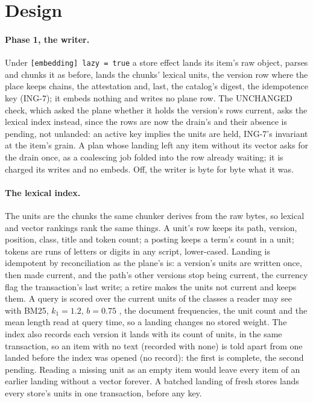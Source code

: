 \documentclass[11pt]{article}
\theoremstyle{plain}
\theoremstyle{definition}
\theoremstyle{remark}
\newcommand{\code}[1]{\texttt{#1}}
\newcommand{\ing}[1]{ING-#1}
\begin{document}
\section{Design}\label{sec:design}

\paragraph{Phase 1, the writer.} Under \code{[embedding] lazy = true} a store effect lands its
item's raw object, parses and chunks it as before, lands the chunks' lexical units, the version
row where the place keeps chains, the attestation and, last, the catalog's digest, the idempotence
key (\ing{7}); it embeds nothing and writes no plane row. The UNCHANGED check, which asked the
plane whether it holds the version's rows current, asks the lexical index instead, since the rows
are now the drain's and their absence is pending, not unlanded: an active key implies the units
are held, \ing{7}'s invariant at the item's grain. A plan whose landing left any item without its
vector asks for the drain once, as a coalescing job folded into the row already waiting; it is
charged its writes and no embeds. Off, the writer is byte for byte what it was.

\paragraph{The lexical index.} The units are the chunks the same chunker derives from the raw
bytes, so lexical and vector rankings rank the same things. A unit's row keeps its path, version,
position, class, title and token count; a posting keeps a term's count in a unit; tokens are runs
of letters or digits in any script, lower-cased. Landing is idempotent by reconciliation as the
plane's is: a version's units are written once, then made current, and the path's other versions
stop being current, the currency flag the transaction's last write; a retire makes the units not
current and keeps them. A query is scored over the current units of the classes a reader may see
with BM25, $k_1 = 1.2$, $b = 0.75$ \citep{robertson2009bm25}, the document frequencies, the unit
count and the mean length read at query time, so a landing changes no stored weight. The index
also records each version it lands with its count of units, in the same transaction, so an item
with no text (recorded with none) is told apart from one landed before the index was opened (no
record): the first is complete, the second pending. Reading a missing unit as an empty item would
leave every item of an earlier landing without a vector forever. A batched landing of fresh
stores lands every store's units in one transaction, before any key.
\end{document}
